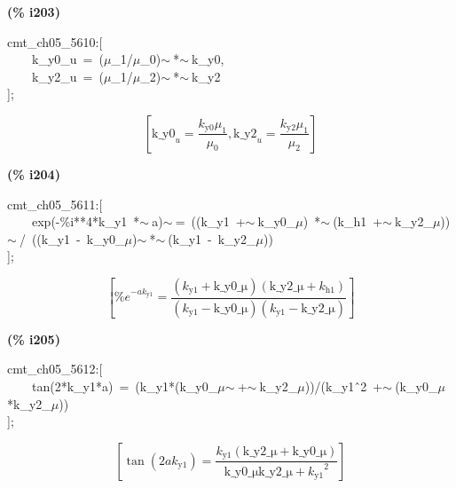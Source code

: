 \documentclass[fleqn]{article}
\begin{document}
\noindent
\begin{minipage}[t]{4.000000em}\color{red}\bfseries
(\% i203)	
\end{minipage}
\begin{minipage}[t]{\textwidth}\color{blue}
cmt\_ch05\_5610:[\\
\ \ \ \ k\_y0\_u\ =\ (\ensuremath{\mu}\_1/\ensuremath{\mu}\_0)\ensuremath{\sim\ }*\ensuremath{\sim\ }k\_y0,\\
\ \ \ \ k\_y2\_u\ =\ (\ensuremath{\mu}\_1/\ensuremath{\mu}\_2)\ensuremath{\sim\ }*\ensuremath{\sim\ }k\_y2\\
];
\end{minipage}
\[\displaystyle \tag{\% o203} 
\left[ {{\ensuremath{\mathrm{k\_ y0}}}_u}=\frac{{k_{\ensuremath{\mathrm{y0}}}} {{\mu }_1}}{{{\mu }_0}}\operatorname{,}{{\ensuremath{\mathrm{k\_ y2}}}_u}=\frac{{k_{\ensuremath{\mathrm{y2}}}} {{\mu }_1}}{{{\mu }_2}}\right] \mbox{}
\]


\noindent
\begin{minipage}[t]{4.000000em}\color{red}\bfseries
(\% i204)	
\end{minipage}
\begin{minipage}[t]{\textwidth}\color{blue}
cmt\_ch05\_5611:[\\
\ \ \ \ exp(-\%i**4*k\_y1\ *\ensuremath{\sim\ }a)\ensuremath{\sim\ }=\ ((k\_y1\ +\ensuremath{\sim\ }k\_y0\_\ensuremath{\mu})\ *\ensuremath{\sim\ }(k\_h1\ +\ensuremath{\sim\ }k\_y2\_\ensuremath{\mu}))\ensuremath{\sim\ }/\ ((k\_y1\ -\ k\_y0\_\ensuremath{\mu})\ensuremath{\sim\ }*\ensuremath{\sim\ }(k\_y1\ -\ k\_y2\_\ensuremath{\mu}))\\
];
\end{minipage}
\[\displaystyle \tag{\% o204} 
\left[ {{\% e}^{-a {k_{\ensuremath{\mathrm{y1}}}}}}=\frac{\left( {k_{\ensuremath{\mathrm{y1}}}}+\ensuremath{\mathrm{k\_ y0\_ \mu }}\right)  \left( \ensuremath{\mathrm{k\_ y2\_ \mu }}+{k_{\ensuremath{\mathrm{h1}}}}\right) }{\left( {k_{\ensuremath{\mathrm{y1}}}}-\ensuremath{\mathrm{k\_ y0\_ \mu }}\right)  \left( {k_{\ensuremath{\mathrm{y1}}}}-\ensuremath{\mathrm{k\_ y2\_ \mu }}\right) }\right] \mbox{}
\]


\noindent
\begin{minipage}[t]{4.000000em}\color{red}\bfseries
(\% i205)	
\end{minipage}
\begin{minipage}[t]{\textwidth}\color{blue}
cmt\_ch05\_5612:[\\
\ \ \ \ tan(2*k\_y1*a)\ =\ (k\_y1*(k\_y0\_\ensuremath{\mu}\ensuremath{\sim\ }+\ensuremath{\sim\ }k\_y2\_\ensuremath{\mu}))/(k\_y1\^\ 2\ +\ensuremath{\sim\ }(k\_y0\_\ensuremath{\mu}*k\_y2\_\ensuremath{\mu}))\\
];
\end{minipage}
\[\displaystyle \tag{\% o205} 
\left[ \tan{\left( 2 a {k_{\ensuremath{\mathrm{y1}}}}\right) }=\frac{{k_{\ensuremath{\mathrm{y1}}}} \left( \ensuremath{\mathrm{k\_ y2\_ \mu }}+\ensuremath{\mathrm{k\_ y0\_ \mu }}\right) }{\ensuremath{\mathrm{k\_ y0\_ \mu }} \ensuremath{\mathrm{k\_ y2\_ \mu }}+{{{k_{\ensuremath{\mathrm{y1}}}}}^{2}}}\right] \mbox{}
\]
\end{document}
